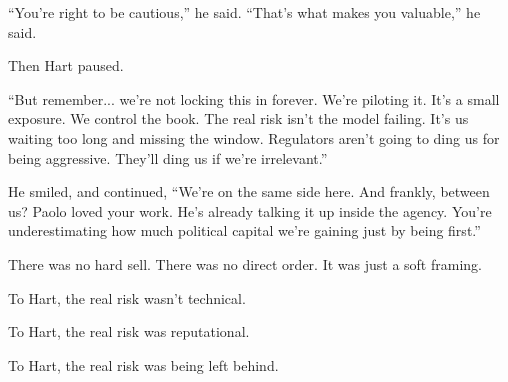 ``You’re right to be cautious,'' he said.  
``That’s what makes you valuable,'' he said.

Then Hart paused.

``But remember... we’re not locking this in forever. We’re piloting it. It's a small exposure. We control the book. The real 
risk isn’t the model failing. It’s us waiting too long and missing the window. Regulators aren’t going to ding us for being 
aggressive. They’ll ding us if we’re irrelevant.''

He smiled, and continued, ``We’re on the same side here. And frankly, between us? Paolo loved your work. He’s already 
talking it up inside the agency. You’re underestimating how much political capital we’re gaining just by being first.''

There was no hard sell. There was no direct order.  It was just a soft framing.  

To Hart, the real risk wasn’t technical.  

To Hart, the real risk was reputational.  

To Hart, the real risk was being left behind.

